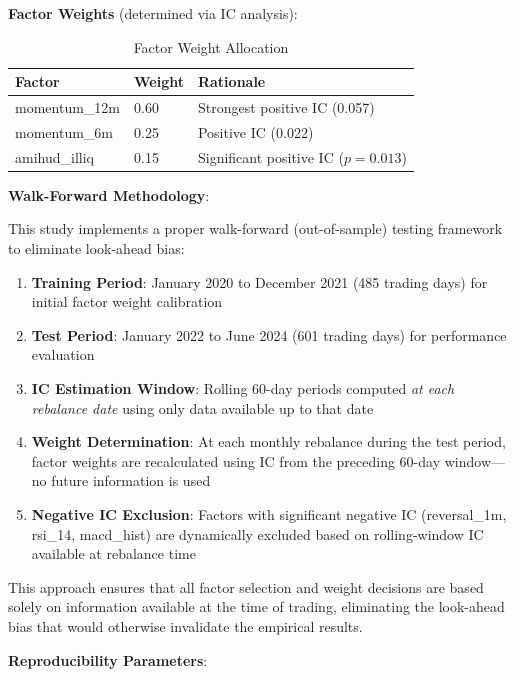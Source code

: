 \documentclass[12pt]{article}
\begin{document}
\textbf{Factor Weights} (determined via IC analysis):

\begin{table}[h]
\centering
\caption{Factor Weight Allocation}
\begin{tabular}{lll}
\toprule
\textbf{Factor} & \textbf{Weight} & \textbf{Rationale} \\
\midrule
momentum\_12m & 0.60 & Strongest positive IC (0.057) \\
momentum\_6m & 0.25 & Positive IC (0.022) \\
amihud\_illiq & 0.15 & Significant positive IC ($p=0.013$) \\
\bottomrule
\end{tabular}
\end{table}

\textbf{Walk-Forward Methodology}:

This study implements a proper walk-forward (out-of-sample) testing framework to eliminate look-ahead bias:

\begin{enumerate}
    \item \textbf{Training Period}: January 2020 to December 2021 (485 trading days) for initial factor weight calibration
    \item \textbf{Test Period}: January 2022 to June 2024 (601 trading days) for performance evaluation
    \item \textbf{IC Estimation Window}: Rolling 60-day periods computed \textit{at each rebalance date} using only data available up to that date
    \item \textbf{Weight Determination}: At each monthly rebalance during the test period, factor weights are recalculated using IC from the preceding 60-day window---no future information is used
    \item \textbf{Negative IC Exclusion}: Factors with significant negative IC (reversal\_1m, rsi\_14, macd\_hist) are dynamically excluded based on rolling-window IC available at rebalance time
\end{enumerate}

This approach ensures that all factor selection and weight decisions are based solely on information available at the time of trading, eliminating the look-ahead bias that would otherwise invalidate the empirical results.

\textbf{Reproducibility Parameters}:
\end{document}
